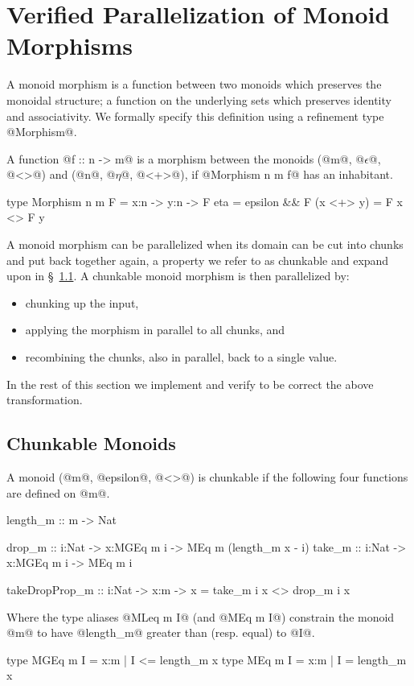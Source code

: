 \section{Verified Parallelization of Monoid Morphisms}\label{sec:parallelization}

A monoid morphism is a function between two monoids which
preserves the monoidal structure; \ie a function on the underlying
sets which preserves identity and associativity. We formally specify
this definition using a refinement type @Morphism@.
%
\begin{definition}\label{definition:morphism}
A function @f :: n -> m@ is a morphism
between the monoids
(@m@, @$\epsilon$@, @<>@)
and (@n@, @$\eta$@, @<+>@),
if @Morphism n m f@ has an inhabitant.
\begin{code}
  type Morphism n m F 
    = x:n -> y:n -> {F eta = epsilon && F (x <+> y) = F x <> F y}
\end{code}
\end{definition}

A monoid morphism can be parallelized when its domain can be cut into
chunks and put back together again, a property we refer to as
chunkable and expand upon in \S~\ref{subsec:chunkable}. A
chunkable monoid morphism is then parallelized by:
\begin{itemize}
  \item chunking up the input,
  \item applying the morphism in parallel to all chunks, and
  \item recombining the chunks, also in parallel, back to a single value.
\end{itemize}
In the rest of this section we implement and verify to be correct the above
transformation.

\subsection{Chunkable Monoids}\label{subsec:chunkable}
\begin{definition}\label{definition:chunkable}
A monoid (@m@, @epsilon@, @<>@) is chunkable
if the following four functions are defined on @m@.
\begin{code}
  length_m :: m -> Nat

  drop_m   :: i:Nat -> x:MGEq m i -> MEq m (length_m x - i)
  take_m   :: i:Nat -> x:MGEq m i -> MEq m i

  takeDropProp_m :: i:Nat -> x:m -> {x = take_m i x <> drop_m i x}
\end{code}

Where the type aliases @MLeq m I@ (and @MEq m I@)
constrain the monoid @m@ to have @length_m@
greater than (resp. equal) to @I@.
\begin{code}
  type MGEq m I = {x:m | I <= length_m x}
  type MEq  m I = {x:m | I =  length_m x}
\end{code}
\end{definition}

